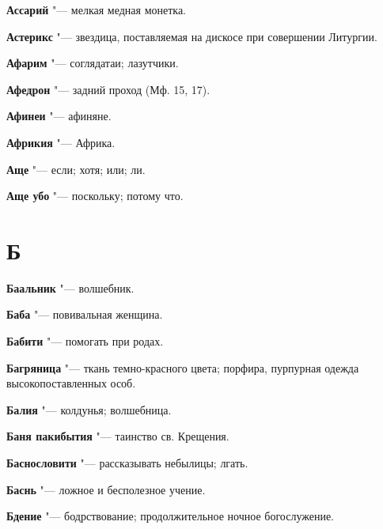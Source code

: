\begin{mymulticols}{2}
\noindent\textbf{Ассарий} "--- мелкая медная монетка. 




\noindent\textbf{Астерикс} "--- звездица, поставляемая на дискосе при совершении Литургии. 




\noindent\textbf{Афарим} "--- соглядатаи; лазутчики. 




\noindent\textbf{Афедрон} "--- задний проход (Мф. 15, 17). 




\noindent\textbf{Афинеи} "--- афиняне. 




\noindent\textbf{Африкия} "--- Африка. 




\noindent\textbf{Аще} "--- если; хотя; или; ли. 




\noindent\textbf{Аще убо} "--- поскольку; потому что. 




\section{Б} 





\noindent\textbf{Баальник} "--- волшебник. 




\noindent\textbf{Баба} "--- повивальная женщина. 




\noindent\textbf{Бабити} "--- помогать при родах. 




\noindent\textbf{Багряница} "--- ткань темно-красного цвета; порфира, пурпурная одежда высокопоставленных особ. 




\noindent\textbf{Балия} "--- колдунья; волшебница. 




\noindent\textbf{Баня пакибытия} "--- таинство св. Крещения. 




\noindent\textbf{Баснословити} "--- рассказывать небылицы; лгать. 




\noindent\textbf{Баснь} "--- ложное и бесполезное учение. 




\noindent\textbf{Бдение} "--- бодрствование; продолжительное ночное богослужение. 





\end{mymulticols}
